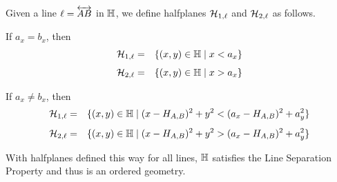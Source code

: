 \begin{prop}
Given a line \(\ell = \overleftrightarrow{AB}\) in \(\mathbb{H}\), we define halfplanes \(\mathcal{H}_{1,\ell}\) and \(\mathcal{H}_{2,\ell}\) as follows.
\begin{proplist}
\item If \(a_x = b_x\), then
\begin{eqnarray*}
\mathcal{H}_{1,\ell} & = & \{ (x,y) \in \mathbb{H} \mid x < a_x \} \\[4pt]
\mathcal{H}_{2,\ell} & = & \{ (x,y) \in \mathbb{H} \mid x > a_x \}
\end{eqnarray*}

\item If \(a_x \neq b_x\), then
\begin{eqnarray*}
\mathcal{H}_{1,\ell} & = & \{ (x,y) \in \mathbb{H} \mid (x - H_{A,B})^2 + y^2 < (a_x - H_{A,B})^2 + a_y^2 \} \\[4pt]
\mathcal{H}_{2,\ell} & = & \{ (x,y) \in \mathbb{H} \mid (x - H_{A,B})^2 + y^2 > (a_x - H_{A,B})^2 + a_y^2 \}
\end{eqnarray*}
\end{proplist}
With halfplanes defined this way for all lines, \(\mathbb{H}\) satisfies the Line Separation Property and thus is an ordered geometry.
\end{prop}

